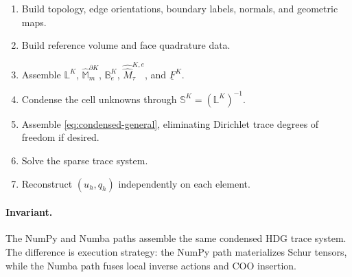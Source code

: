 \documentclass[11pt]{article}
\newcommand{\FK}{\underline F^K}
\newcommand{\LK}{\mathbb L^K}
\newcommand{\SK}{\mathbb S^K}
\newcommand{\B}{\mathbb B}
\newcommand{\Mbb}{\widehat{\mathbb M}}
\newcommand{\Mhh}{\widehat{\widehat M}}
\begin{document}
\begin{enumerate}[leftmargin=2em]
    \item Build topology, edge orientations, boundary labels, normals, and geometric maps.
    \item Build reference volume and face quadrature data.
    \item Assemble $\LK$, $\Mbb_m^{\partial K}$, $\B_e^K$, $\Mhh_\tau^{K,e}$, and $\FK$.
    \item Condense the cell unknowns through $\SK=(\LK)^{-1}$.
    \item Assemble \eqref{eq:condensed-general}, eliminating Dirichlet trace degrees of freedom if desired.
    \item Solve the sparse trace system.
    \item Reconstruct $(u_h,q_h)$ independently on each element.
\end{enumerate}

\paragraph{Invariant.}
The NumPy and Numba paths assemble the same condensed HDG trace system. The difference is execution strategy: the NumPy path materializes Schur tensors, while the Numba path fuses local inverse actions and COO insertion.
\end{document}
